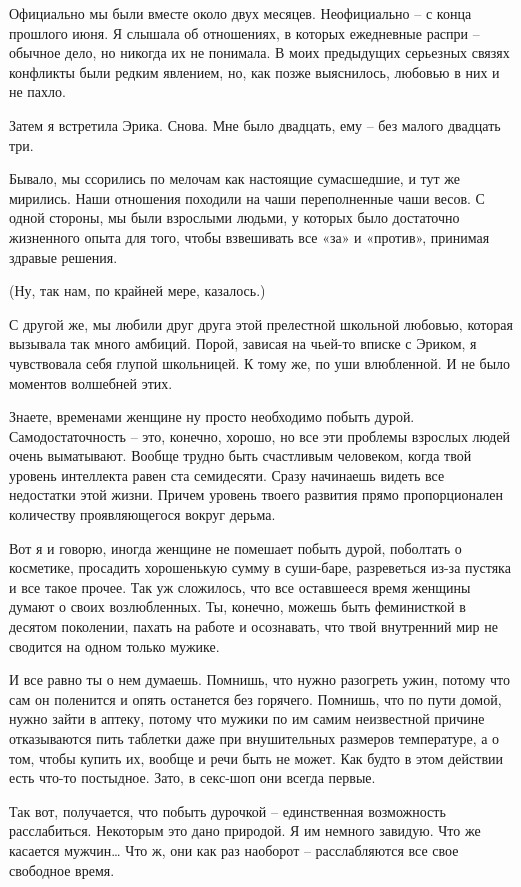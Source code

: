 \documentclass[
]{book}
\begin{document}
Официально мы были вместе около двух месяцев. Неофициально -- с конца прошлого июня. Я слышала об отношениях, в которых ежедневные распри -- обычное дело, но никогда их не понимала. В моих предыдущих серьезных связях конфликты были редким явлением, но, как позже выяснилось, любовью в них и не пахло.

Затем я встретила Эрика. Снова. Мне было двадцать, ему -- без малого двадцать три.

Бывало, мы ссорились по мелочам как настоящие сумасшедшие, и тут же мирились. Наши отношения походили на чаши переполненные чаши весов. С одной стороны, мы были взрослыми людьми, у которых было достаточно жизненного опыта для того, чтобы взвешивать все «за» и «против», принимая здравые решения.

(Ну, так нам, по крайней мере, казалось.)

С другой же, мы любили друг друга этой прелестной школьной любовью, которая вызывала так много амбиций. Порой, зависая на чьей-то вписке с Эриком, я чувствовала себя глупой школьницей. К тому же, по уши влюбленной. И не было моментов волшебней этих.

Знаете, временами женщине ну просто необходимо побыть дурой. Самодостаточность -- это, конечно, хорошо, но все эти проблемы взрослых людей очень выматывают. Вообще трудно быть счастливым человеком, когда твой уровень интеллекта равен ста семидесяти. Сразу начинаешь видеть все недостатки этой жизни. Причем уровень твоего развития прямо пропорционален количеству проявляющегося вокруг дерьма.

Вот я и говорю, иногда женщине не помешает побыть дурой, поболтать о косметике, просадить хорошенькую сумму в суши-баре, разреветься из-за пустяка и все такое прочее. Так уж сложилось, что все оставшееся время женщины думают о своих возлюбленных. Ты, конечно, можешь быть феминисткой в десятом поколении, пахать на работе и осознавать, что твой внутренний мир не сводится на одном только мужике.

И все равно ты о нем думаешь. Помнишь, что нужно разогреть ужин, потому что сам он поленится и опять останется без горячего. Помнишь, что по пути домой, нужно зайти в аптеку, потому что мужики по им самим неизвестной причине отказываются пить таблетки даже при внушительных размеров температуре, а о том, чтобы купить их, вообще и речи быть не может. Как будто в этом действии есть что-то постыдное. Зато, в секс-шоп они всегда первые.

Так вот, получается, что побыть дурочкой -- единственная возможность расслабиться. Некоторым это дано природой. Я им немного завидую. Что же касается мужчин\ldots{} Что ж, они как раз наоборот -- расслабляются все свое свободное время.
\end{document}
